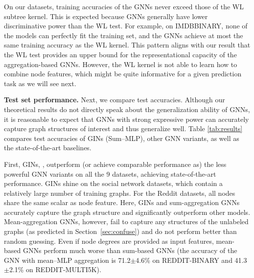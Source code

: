On our datasets, training accuracies of the GNNs never exceed those of the WL subtree kernel. This is expected because GNNs generally have lower discriminative power than the WL test. For example, on IMDBBINARY, none of the models can perfectly fit the training set, and the GNNs achieve at most the same training accuracy as the WL kernel. This pattern aligns with our result that the WL test provides an upper bound for the representational capacity of the aggregation-based GNNs. However, the WL kernel is not able to learn how to combine node features, which might be quite informative for a given prediction task as we will see next. %


{\bf Test set performance.}
Next, we compare test accuracies. Although our theoretical results do not directly speak about the generalization ability of GNNs, it is reasonable to expect that GNNs with strong expressive power can accurately capture graph structures of interest and thus generalize well. Table \ref{tab:results} compares test accuracies of GINs (Sum--MLP), other GNN variants, as well as the state-of-the-art baselines.

First, GINs, , outperform (or achieve comparable performance as) the less powerful GNN variants on all the 9 datasets, achieving state-of-the-art performance. 
GINs shine on the social network datasets, which contain a relatively large number of training graphs. 
For the Reddit datasets, all nodes share the same scalar as node feature. %
Here, GINs and sum-aggregation GNNs accurately capture the graph structure and significantly outperform other models. Mean-aggregation GNNs, however, fail to capture any structures of the unlabeled graphs (as predicted in Section~\ref{sec:confuse}) and do not perform better than random guessing. Even if node degrees are provided as input features, mean-based GNNs perform much worse than sum-based GNNs (the accuracy of the GNN with mean--MLP aggregation is 71.2$\pm$4.6\% on REDDIT-BINARY and 41.3$\pm$2.1\% on REDDIT-MULTI5K).
